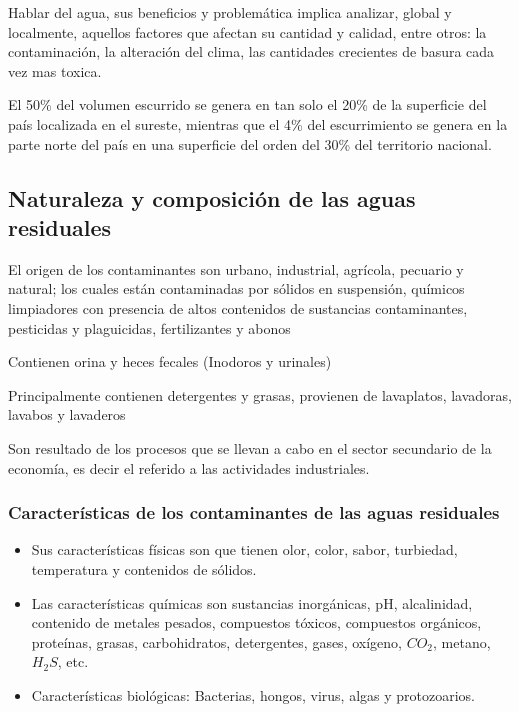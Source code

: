 Hablar del agua, sus beneficios y problemática implica  analizar, global y localmente, aquellos factores que afectan su cantidad y calidad, entre otros: la contaminación,  la alteración del clima, las cantidades crecientes de basura cada vez mas toxica.

El 50\% del volumen escurrido se genera en tan solo el 20\% de la superficie del país localizada en el sureste, mientras que el 4\% del escurrimiento se genera en la parte norte del país en una superficie del orden del 30\% del territorio nacional.

\subsection{Naturaleza y composición de las aguas residuales}
El origen de los contaminantes son urbano, industrial, agrícola, pecuario y natural; los cuales están contaminadas por sólidos en suspensión, químicos limpiadores con presencia de altos contenidos de sustancias contaminantes, pesticidas y plaguicidas, fertilizantes y abonos

\begin{definition}
    Contienen orina y heces fecales (Inodoros y urinales)
\end{definition}

\begin{definition}
    Principalmente contienen detergentes y grasas, provienen de lavaplatos, lavadoras, lavabos y lavaderos
\end{definition}
\begin{definition}
    Son resultado de los procesos que se llevan a cabo en el sector secundario de la economía, es decir el referido a las actividades industriales.
\end{definition}
\subsubsection{Características de los contaminantes de las aguas residuales}
\begin{itemize}
    \item Sus características físicas son que tienen olor, color, sabor, turbiedad, temperatura y contenidos de sólidos.
    \item Las características químicas son sustancias inorgánicas, pH, alcalinidad, contenido de metales pesados, compuestos tóxicos, compuestos orgánicos, proteínas, grasas, carbohidratos, detergentes, gases, oxígeno, $CO_2$, metano, $H_2S$, etc.
    \item Características biológicas: Bacterias, hongos, virus, algas y protozoarios.
\end{itemize}

